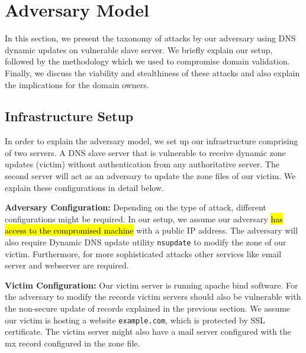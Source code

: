 \section{Adversary Model}

In this section, we present the taxonomy of attacks by our adversary using DNS dynamic updates on vulnerable slave server. We briefly explain our setup, followed by the methodology which we used to compromise domain validation. Finally, we discuss the viability and stealthiness of these attacks and also explain the implications for the domain owners. 


\subsection{Infrastructure Setup}

In order to explain the adversary model, we set up our infrastructure comprising of two servers. A DNS slave server that is vulnerable to receive  dynamic zone updates (victim) without authentication from any authoritative server. The second server will act as an adversary to update the zone files of our victim.  We explain these configurations in detail below. 


\textbf{Adversary Configuration:} Depending on the type of attack, different configurations might be required. In our setup, we assume our adversary \hl{has access to the compromised machine}  with a public IP address. The adversary will also require Dynamic DNS update utility \texttt{nsupdate} to modify the zone of our victim. Furthermore, for more sophisticated attacks other services like email server and webserver are required. %

\textbf{Victim Configuration:} Our victim server is running apache bind software. For the adversary to modify the records victim servers should also be vulnerable with the non-secure update of records explained in the previous section. We assume our victim is hosting a website \texttt{example.com}, which is protected by SSL certificate. The victim server might also have a mail server configured with the mx record configured in the zone file.  
